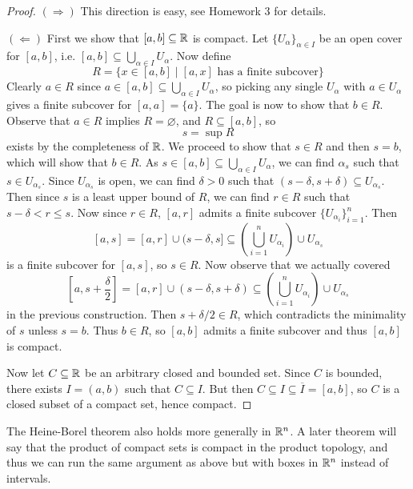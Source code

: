 \begin{proof}
  $(\Rightarrow)$ This direction is easy, see
  Homework 3 for details.

  $(\Leftarrow)$ First we show that
  $[a, b] \subseteq \mathbb{R}$ is compact. Let
  $\{U_\alpha\}_{\alpha \in I}$ be an open
  cover for $[a, b]$, i.e.
  $[a, b] \subseteq \bigcup_{\alpha \in I} U_\alpha$.
  Now define
  \[
    R = \{x \in [a, b] \mid \text{$[a, x]$ has a finite subcover}\}
  \]
  Clearly $a \in R$ since
  $a \in [a, b] \subseteq \bigcup_{\alpha \in I} U_\alpha$,
  so picking any single $U_\alpha$ with $a \in U_\alpha$
  gives a finite subcover for $[a, a] = \{a\}$. The
  goal is now to show that $b \in R$. Observe that
  $a \in R$ implies $R = \varnothing$, and $R \subseteq [a, b]$,
  so
  \[
    s = \sup R
  \]
  exists by the completeness of $\mathbb{R}$. We proceed
  to show that $s \in R$ and then $s = b$, which
  will show that $b \in R$. As $s \in [a, b] \subseteq \bigcup_{\alpha \in I} U_\alpha$,
  we can find $\alpha_s$ such that
  $s \in U_{\alpha_s}$. Since $U_{\alpha_s}$ is
  open, we can find $\delta > 0$ such that
  $(s - \delta, s + \delta) \subseteq U_{\alpha_s}$.
  Then since $s$ is a least upper bound of $R$,
  we can find $r \in R$ such that
  $s - \delta < r \le s$. Now since $r \in R$,
  $[a, r]$ admits a finite subcover
  $\{U_{\alpha_i}\}_{i = 1}^n$. Then
  \[
    [a, s] = [a, r] \cup (s - \delta, s]
    \subseteq \left(\bigcup_{i = 1}^n U_{\alpha_i}\right) \cup U_{\alpha_s}
  \]
  is a finite subcover for $[a, s]$, so $s \in R$.
  Now observe that we actually covered
  \[
    \left[a, s + \frac{\delta}{2}\right]
    = [a, r] \cup (s - \delta, s + \delta)
    \subseteq \left(\bigcup_{i = 1}^n U_{\alpha_i}\right) \cup U_{\alpha_s}
  \]
  in the previous construction. Then
  $s + \delta / 2 \in R$, which contradicts the
  minimality of $s$ unless $s = b$. Thus
  $b \in R$, so $[a, b]$ admits a finite subcover
  and thus $[a, b]$ is compact.

  Now let $C \subseteq \mathbb{R}$ be an arbitrary
  closed and bounded set. Since $C$ is bounded,
  there exists $I = (a, b)$ such that $C \subseteq I$.
  But then $C \subseteq I \subseteq \overline{I} = [a, b]$, so
  $C$ is a closed subset of a compact set, hence
  compact.
\end{proof}

\begin{remark}
  The Heine-Borel theorem also holds more
  generally in $\mathbb{R}^n$.
  A later theorem will
  say that the product of compact sets is compact in
  the product topology,
  and thus we can run the same argument as above but
  with boxes in $\mathbb{R}^n$ instead of intervals.
\end{remark}


